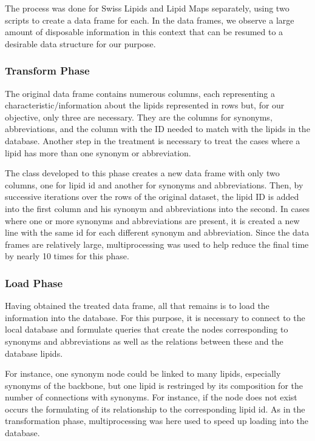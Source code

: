 \documentclass{llncs}
\begin{document}
The process was done for Swiss Lipids and Lipid Maps separately, using two scripts to create a data frame for each. 
In the data frames, we observe a large amount of disposable information in this context that can be resumed to a desirable data structure for our purpose.

\subsubsection{Transform Phase}

The original data frame contains numerous columns, each representing a characteristic/information about the lipids represented in rows but, for our objective, only three are necessary.
They are the columns for synonyms, abbreviations, and the column with the ID needed to match with the lipids in the database. 
Another step in the treatment is necessary to treat the cases where a lipid has more than one synonym or abbreviation.

The class developed to this phase creates a new data frame with only two columns, one for lipid id and another for synonyms and abbreviations.
Then, by successive iterations over the rows of the original dataset, the lipid ID is added into the first column and his synonym and abbreviations into the second. 
In cases where one or more synonyms and abbreviations are present, it is created a new line with the same id for each different synonym and abbreviation.
Since the data frames are relatively large, multiprocessing was used to help reduce the final time by nearly 10 times for this phase.

\subsubsection{Load Phase}
Having obtained the treated data frame, all that remains is to load the information into the database. For this purpose, it is necessary to connect to the local database and formulate queries that create the nodes corresponding 
to synonyms and abbreviations as well as the relations between these and the database lipids.

For instance, one synonym node could be linked to many lipids, especially synonyms of the backbone, 
but one lipid is restringed by its composition for the number of connections with synonyms. For instance, if the node does not exist occurs the formulating of its relationship to the corresponding lipid id.
As in the transformation phase, multiprocessing was here used to speed up loading into the database.
\end{document}
